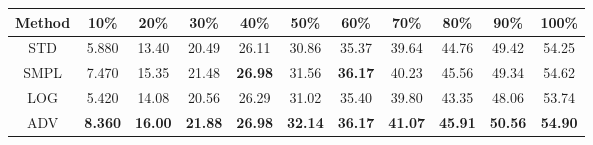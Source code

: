 \documentclass{standalone}
\begin{document}
\begin{tabular}{c|cccccccccc}
      \toprule
      Method & 10\% & 20\% & 30\% & 40\% & 50\% & 60\% & 70\% & 80\% & 90\% & 100\% \\
      \midrule
STD & 5.880 & 13.40 & 20.49 & 26.11 & 30.86 & 35.37 & 39.64 & 44.76 & 49.42 & 54.25\\
SMPL & 7.470 & 15.35 & 21.48 & \textbf{26.98} & 31.56 & \textbf{36.17} & 40.23 & 45.56 & 49.34 & 54.62\\
LOG & 5.420 & 14.08 & 20.56 & 26.29 & 31.02 & 35.40 & 39.80 & 43.35 & 48.06 & 53.74\\
ADV & \textbf{8.360} & \textbf{16.00} & \textbf{21.88} & \textbf{26.98} & \textbf{32.14} & \textbf{36.17} & \textbf{41.07} & \textbf{45.91} & \textbf{50.56} & \textbf{54.90}\\
  \bottomrule
\end{tabular}
\end{document}
